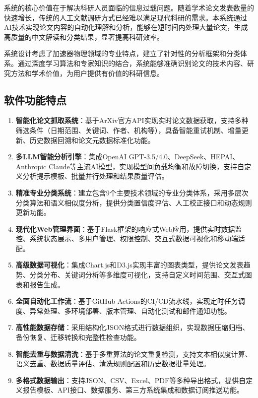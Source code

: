 \documentclass[12pt,a4paper]{article}
\begin{document}
系统的核心价值在于解决科研人员面临的信息过载问题。随着学术论文发表数量的快速增长，传统的人工文献调研方式已经难以满足现代科研的需求。本系统通过AI技术实现论文内容的自动化理解和分析，能够在短时间内处理大量论文，生成高质量的中文解读和分类结果，显著提高科研效率。

系统设计考虑了加速器物理领域的专业特点，建立了针对性的分析框架和分类体系。通过深度学习算法和专家知识的结合，系统能够准确识别论文的技术内容、研究方法和学术价值，为用户提供有价值的科研信息。

\subsection{软件功能特点}
\begin{enumerate}
    \item \textbf{智能化论文抓取系统}：基于ArXiv官方API实现实时论文数据获取，支持多种筛选条件（日期范围、关键词、作者、机构等），具备智能重试机制、增量更新、历史数据回溯和论文元数据标准化功能。
    
    \item \textbf{多LLM智能分析引擎}：集成OpenAI GPT-3.5/4.0、DeepSeek、HEPAI、Anthropic Claude等主流AI模型，实现模型间负载均衡和故障切换，支持自定义分析提示模板、批量并行处理和结果质量评估。
    
    \item \textbf{精准专业分类系统}：建立包含9个主要技术领域的专业分类体系，采用多层次分类算法和语义相似度分析，提供分类置信度评估、人工校正接口和动态规则更新功能。
    
    \item \textbf{现代化Web管理界面}：基于Flask框架的响应式Web应用，提供实时数据监控、系统状态展示、多用户管理、权限控制、交互式数据可视化和移动端适配。
    
    \item \textbf{高级数据可视化}：集成Chart.js和D3.js实现丰富的图表类型，提供论文发表趋势、分类分布、关键词分析等多维度可视化，支持自定义时间范围、交互式图表和报告生成。
    
    \item \textbf{全面自动化工作流}：基于GitHub Actions的CI/CD流水线，实现定时任务调度、异常处理、多环境部署、版本管理、自动化测试和邮件通知功能。
    
    \item \textbf{高性能数据存储}：采用结构化JSON格式进行数据组织，实现数据压缩归档、备份恢复、迁移转换和完整性检查功能。
    
    \item \textbf{智能去重与数据清洗}：基于多重算法的论文重复检测，支持文本相似度计算、语义去重、数据质量评估、清洗规则配置和历史数据批量处理。
    
    \item \textbf{多格式数据输出}：支持JSON、CSV、Excel、PDF等多种导出格式，提供自定义报告模板、API接口、数据服务、第三方系统集成和数据订阅推送功能。
\end{enumerate}
\end{document}
